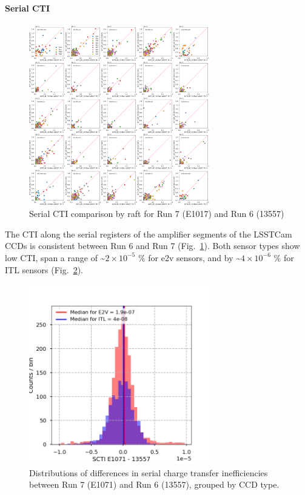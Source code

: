 \paragraph{Serial CTI}\label{serial-cti}

\begin{figure}[H]
\begin{centering}
\includegraphics[width=0.7\textwidth]{figures/baselineCharacterization/13557_E1071_SCTI_EF_43.png}
	\caption{Serial CTI comparison by raft for Run 7 (E1017) and Run 6 (13557)\label{fig:serial-cti}}
\end{centering}
\end{figure}

The CTI along the serial registers of the amplifier segments of the LSSTCam CCDs is consistent between Run 6 and
Run 7 (Fig.~\ref{fig:serial-cti}). Both sensor types show low CTI,
span a range  of \textasciitilde$2 \times 10^{-5}$ \% for e2v sensors, and
by \textasciitilde$4 \times 10^{-6}$  \% for ITL sensors (Fig.~\ref{fig:serial-cti-dist}).

\begin{figure}[H]
\begin{centering}
\includegraphics[width=0.7\textwidth]{figures/baselineCharacterization/SCTI_13557_E1071_diff.png}
\caption{Distributions of differences in serial charge transfer inefficiencies between Run 7 (E1071) and Run 6 (13557), grouped by CCD type.}
\label{fig:serial-cti-dist}
\end{centering}
\end{figure}

